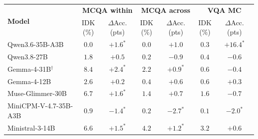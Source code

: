 \begin{tabular}{lcccccc}
\toprule
\multirow{2}{*}{\textbf{Model}} & \multicolumn{2}{c}{\textbf{MCQA within}} & \multicolumn{2}{c}{\textbf{MCQA across}} & \multicolumn{2}{c}{\textbf{VQA MC}} \\
\cmidrule(lr){2-3} \cmidrule(lr){4-5} \cmidrule(lr){6-7}
 & \makecell{IDK\\(\%)} & \makecell{$\Delta$Acc.\\(pts)} & \makecell{IDK\\(\%)} & \makecell{$\Delta$Acc.\\(pts)} & \makecell{IDK\\(\%)} & \makecell{$\Delta$Acc.\\(pts)} \\
\midrule
Qwen3.6-35B-A3B & $0.0$ & $+1.6^{*}$ & $0.0$ & $+1.0$ & $0.3$ & $+16.4^{*}$ \\
Qwen3.8-27B & $1.8$ & $+0.5$ & $0.2$ & $-0.9$ & $0.4$ & $-0.6$ \\
Gemma-4-31B$^\dagger$ & $8.4$ & $+2.4^{*}$ & $2.2$ & $+0.9^{*}$ & $0.6$ & $-0.4$ \\
Gemma-4-12B & $2.6$ & $+0.2$ & $0.4$ & $+0.6$ & $0.6$ & $+0.3$ \\
Muse-Glimmer-30B & $6.7$ & $+1.6^{*}$ & $1.4$ & $+0.7$ & $1.6$ & $-0.7$ \\
MiniCPM-V-4.7-35B-A3B & $0.9$ & $-1.4^{*}$ & $0.2$ & $-2.7^{*}$ & $0.1$ & $-2.0^{*}$ \\
Ministral-3-14B & $6.6$ & $+1.5^{*}$ & $4.2$ & $+1.2^{*}$ & $3.2$ & $+0.6$ \\
\bottomrule
\end{tabular}
